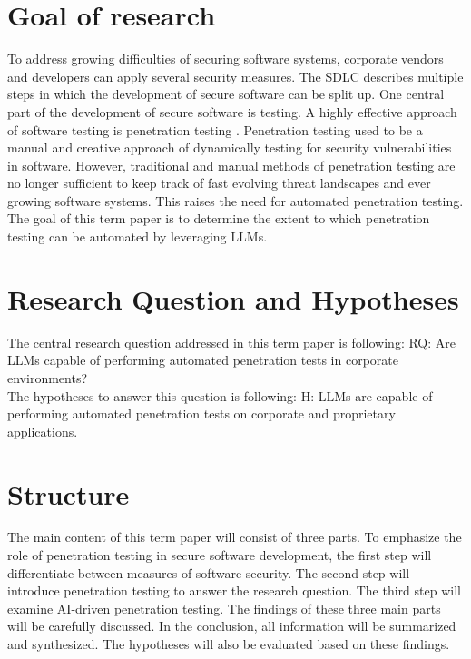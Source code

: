 \section{Goal of research}
\label{sec:intro:goal}
To address growing difficulties of securing software systems, corporate vendors and developers can apply several security measures. The \ac{SDLC} describes multiple steps in which the development of secure software can be split up. One central part of the development of secure software is testing. \cite{McGraw_2004} A highly effective approach of software testing is penetration testing \cite{Lachkov_2022}. Penetration testing used to be a manual and creative approach of dynamically testing for security vulnerabilities in software. However, traditional and manual methods of penetration testing are no longer sufficient to keep track of fast evolving threat landscapes and ever growing software systems. This raises the need for automated penetration testing. \cite{Stefinko_2024} The goal of this term paper is to determine the extent to which penetration testing can be automated by leveraging \ac{LLM}s.

%
%
\section{Research Question and Hypotheses}
\label{sec:intro:research_question}
The central research question addressed in this term paper is following: RQ: Are \ac{LLM}s capable of performing automated penetration tests in corporate environments?\\

\noindent The hypotheses to answer this question is following: H: \ac{LLM}s are capable of performing automated penetration tests on corporate and proprietary applications.

%
%
\section{Structure}
\label{sec:intro:structure}
The main content of this term paper will consist of three parts. To emphasize the role of penetration testing in secure software development, the first step will differentiate between measures of software security. The second step will introduce penetration testing to answer the research question. The third step will examine \ac{AI}-driven penetration testing. The findings of these three main parts will be carefully discussed. In the conclusion, all information will be summarized and synthesized. The hypotheses will also be evaluated based on these findings.

